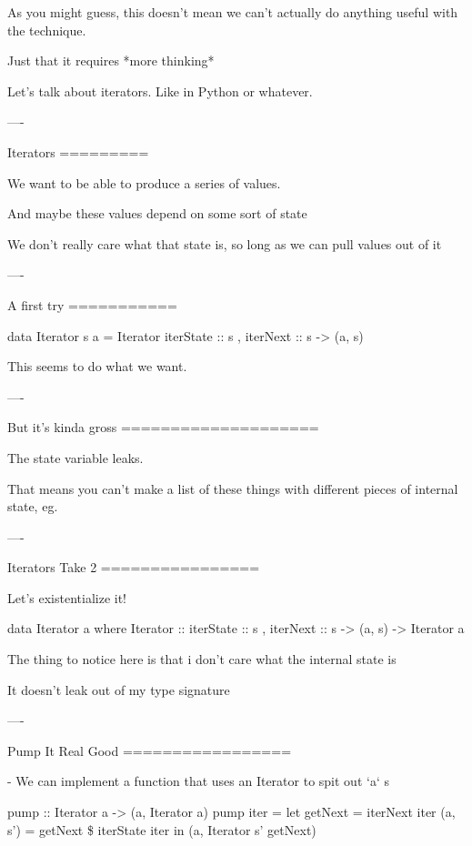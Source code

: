 As you might guess, this doesn't mean we can't actually do anything useful with the technique.

Just that it requires *more thinking*

Let's talk about iterators. Like in Python or whatever.

----

Iterators
=========

We want to be able to produce a series of values.

And maybe these values depend on some sort of state

We don't really care what that state is, so long as we can pull values out of it

----

A first try
===========

\begin{hs}
  data Iterator s a = Iterator
    { iterState :: s
    , iterNext  :: s -> (a, s)
    }
\end{hs}

This seems to do what we want.

----

But it's kinda gross
====================

The state variable leaks.

That means you can't make a list of these things with different pieces of internal state, eg.

----

Iterators Take 2
================

Let's existentialize it!

\begin{hs}
  data Iterator a where
    Iterator :: { iterState :: s
                , iterNext  :: s -> (a, s)
                } -> Iterator a
\end{hs}

The thing to notice here is that i don't care what the internal state is

It doesn't leak out of my type signature

----

Pump It Real Good
=================

- We can implement a function that uses an Iterator to spit out `a` s

\begin{hs}
  pump :: Iterator a -> (a, Iterator a)
  pump iter = let getNext = iterNext iter
                  (a, s') = getNext \$ iterState iter
               in (a, Iterator s' getNext)
\end{hs}

